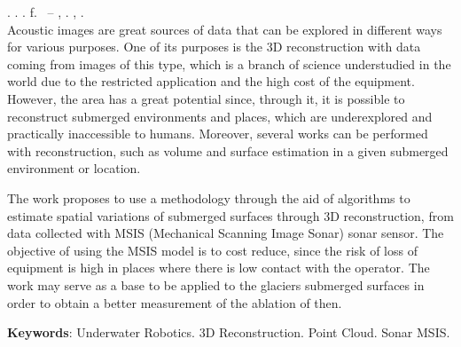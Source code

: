 
\begin{resumo}[ABSTRACT]
\begin{SingleSpacing}

\imprimirautorcitacao. \imprimirtitleabstract. \imprimirdata. \pageref {LastPage} f. \imprimirprojeto\ – \imprimirprograma, \imprimirinstituicao. \imprimirlocal, \imprimirdata.\\


Acoustic images are great sources of data that can be explored in different ways for various purposes.
One of its purposes is the 3D reconstruction with data coming from images of this type, which is a branch of science understudied in the world due to the restricted application and the high cost of the equipment.
However, the area has a great potential since, through it, it is possible to reconstruct submerged environments and places, which are underexplored and practically inaccessible to humans.
Moreover, several works can be performed with reconstruction, such as volume and surface estimation in a given submerged environment or location.

The work proposes to use a methodology through the aid of algorithms to estimate spatial variations of submerged surfaces through 3D reconstruction, from data collected with MSIS (Mechanical Scanning Image Sonar) sonar sensor.
The objective of using the MSIS model is to cost reduce, since the risk of loss of equipment is high in places where there is low contact with the operator.
The work may serve as a base to be applied to the glaciers submerged surfaces in order to obtain a better measurement of the ablation of then.

\vspace{2em}
\textbf{Keywords}: Underwater Robotics. 3D Reconstruction. Point Cloud. Sonar MSIS.

\end{SingleSpacing}
\end{resumo}

